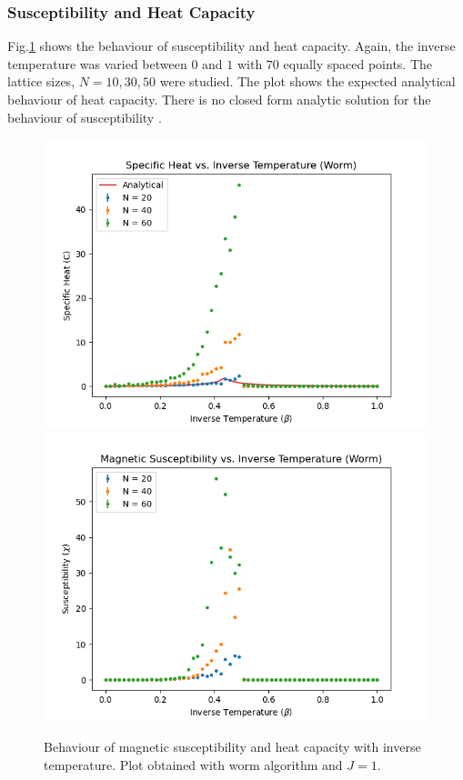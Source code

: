\documentclass[%
reprint,
 amsmath,amssymb,
 aps,
]{revtex4-2}
\begin{document}
\subsubsection{Susceptibility and Heat Capacity}
 Fig.\ref{fig:wormcchi} shows the behaviour of susceptibility and heat capacity. Again, the inverse temperature was varied between $0$ and $1$ with $70$ equally spaced points. The lattice sizes, $N = 10, 30, 50$ were studied. The plot shows the expected analytical behaviour of heat capacity. There is no closed form analytic solution for the behaviour of susceptibility \cite{suscep}.
\begin{figure}[h!]
    \centering
    \includegraphics[width=\columnwidth]{worm_heat_1.png}
    \includegraphics[width=\columnwidth]{worm_suscep.png}
    \caption{Behaviour of magnetic susceptibility and heat capacity with inverse temperature. Plot obtained with worm algorithm and $J=1$.}
    \label{fig:wormcchi}
\end{figure}
\end{document}
